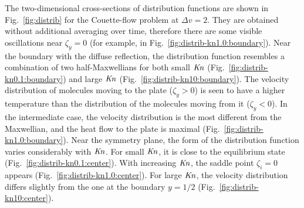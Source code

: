 \documentclass[final]{jfm} %
\newcommand{\Kn}{\mbox{\textit{Kn}}}
\begin{document}
The two-dimensional cross-sections of distribution functions are shown
in Fig.~\ref{fig:distrib} for the Couette-flow problem at \(\Delta{v}=2\).
They are obtained without additional averaging over time,
therefore there are some visible oscillations near \(\zeta_y=0\)
(for example, in Fig.~\ref{fig:distrib-kn1.0:boundary}).
Near the boundary with the diffuse reflection, the distribution function resembles
a combination of two half-Maxwellians for both small \(\Kn\) (Fig.~\ref{fig:distrib-kn0.1:boundary})
and large \(\Kn\) (Fig.~\ref{fig:distrib-kn10:boundary}).
The velocity distribution of molecules moving to the plate (\(\zeta_y>0\)) is seen to
have a higher temperature than the distribution of the molecules moving from it (\(\zeta_y<0\)).
In the intermediate case, the velocity distribution is the most different from the Maxwellian,
and the heat flow to the plate is maximal (Fig.~\ref{fig:distrib-kn1.0:boundary}).
Near the symmetry plane, the form of the distribution function
varies considerably with \(\Kn\).
For small \(\Kn\), it is close to the equilibrium state (Fig.~\ref{fig:distrib-kn0.1:center}).
With increasing \(\Kn\), the saddle point \(\zeta_i=0\) appears (Fig.~\ref{fig:distrib-kn1.0:center}).
For large \(\Kn\), the velocity distribution differs slightly from the one
at the boundary \(y=1/2\) (Fig.~\ref{fig:distrib-kn10:center}).
\end{document}
